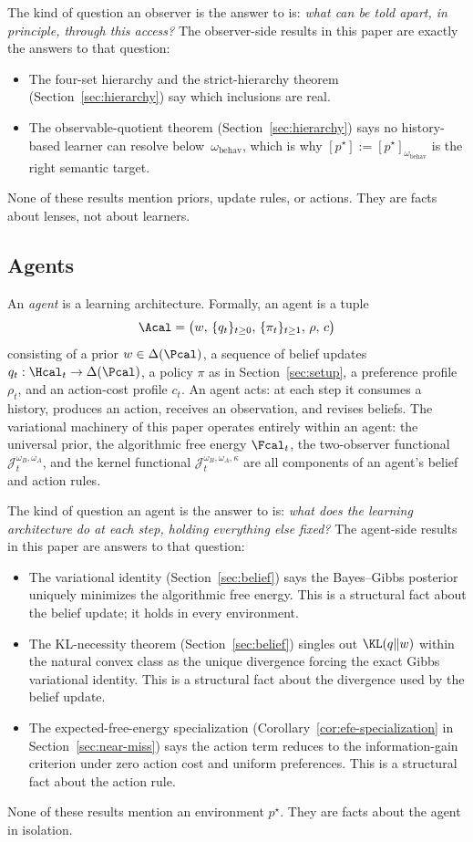 The kind of question an observer is the answer to is: \emph{what can be told apart, in principle, through this access?} The observer-side results in this paper are exactly the answers to that question:
\begin{itemize}
\item The four-set hierarchy and the strict-hierarchy theorem (Section~\ref{sec:hierarchy}) say which inclusions are real.
\item The observable-quotient theorem (Section~\ref{sec:hierarchy}) says no history-based learner can resolve below~$\omega_{\mathrm{behav}}$, which is why $[p^\star]:=[p^\star]_{\omega_{\mathrm{behav}}}$ is the right semantic target.
\end{itemize}
None of these results mention priors, update rules, or actions. They are facts about lenses, not about learners.

\subsection{Agents}
\label{sec:ontology-agents}

An \emph{agent} is a learning architecture. Formally, an agent is a tuple
\[
\Acal=\bigl(w,\,\{q_t\}_{t\ge0},\,\{\pi_t\}_{t\ge1},\,\rho,\,c\bigr)
\]
consisting of a prior $w\in\Delta(\Pcal)$, a sequence of belief updates $q_t:\Hcal_t\to\Delta(\Pcal)$, a policy $\pi$ as in Section~\ref{sec:setup}, a preference profile $\rho_t$, and an action-cost profile $c_t$. An agent acts: at each step it consumes a history, produces an action, receives an observation, and revises beliefs. The variational machinery of this paper operates entirely within an agent: the universal prior, the algorithmic free energy $\Fcal_t$, the two-observer functional $\mathcal J_t^{\omega_B,\omega_A}$, and the kernel functional $\mathcal J_t^{\omega_B,\omega_A,\kappa}$ are all components of an agent's belief and action rules.

The kind of question an agent is the answer to is: \emph{what does the learning architecture do at each step, holding everything else fixed?} The agent-side results in this paper are answers to that question:
\begin{itemize}
\item The variational identity (Section~\ref{sec:belief}) says the Bayes--Gibbs posterior uniquely minimizes the algorithmic free energy. This is a structural fact about the belief update; it holds in every environment.
\item The KL-necessity theorem (Section~\ref{sec:belief}) singles out $\KL(q\|w)$ within the natural convex class as the unique divergence forcing the exact Gibbs variational identity. This is a structural fact about the divergence used by the belief update.
\item The expected-free-energy specialization (Corollary~\ref{cor:efe-specialization} in Section~\ref{sec:near-miss}) says the action term reduces to the information-gain criterion under zero action cost and uniform preferences. This is a structural fact about the action rule.
\end{itemize}
None of these results mention an environment $p^\star$. They are facts about the agent in isolation.

